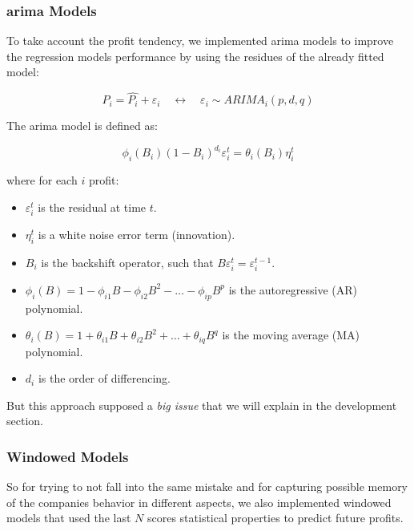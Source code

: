 \documentclass[11pt,english,a4paper,hidelinks]{book}
\begin{document}
\subsubsection{\Acrshort{arima} Models}
To take account the profit tendency, we implemented \acrshort{arima} models to improve the regression models performance by using the residues of the already fitted model:

\begin{equation}
    P_i = \hat{P_i} + {\varepsilon_i} \quad \longleftrightarrow \quad {\varepsilon_i} \sim ARIMA_i(p,d,q)
\end{equation}

\noindent The \acrshort{arima} model is defined as:

\begin{equation}
    \phi_i(B_i){(1 - B_i)}^{d_i} \varepsilon_i^t = \theta_i(B_i) \eta_i^t
    \end{equation}
    
    \noindent where for each \(i\) profit:
    \begin{itemize}
      \item \(\varepsilon_i^t\) is the residual at time \(t\).
      \item \(\eta_i^t\) is a white noise error term (innovation).
      \item \(B_i\) is the backshift operator, such that \(B \varepsilon_i^t = \varepsilon_i^{t-1}\).
      \item \(\phi_i(B) = 1 - \phi_{i1} B - \phi_{i2} B^2 - \dots - \phi_{ip} B^p\) is the autoregressive (AR) polynomial.
      \item \(\theta_i(B) = 1 + \theta_{i1} B + \theta_{i2} B^2 + \dots + \theta_{iq} B^q\) is the moving average (MA) polynomial.
      \item \(d_i\) is the order of differencing.
    \end{itemize}
    
\noindent But this approach supposed a \textit{big issue} that we will explain in the development section.

\subsubsection{Windowed Models}
So for trying to not fall into the same mistake and for capturing possible memory of the companies behavior in different aspects, we also implemented windowed models that used the last \(N\) scores statistical properties to predict future profits.
\end{document}
